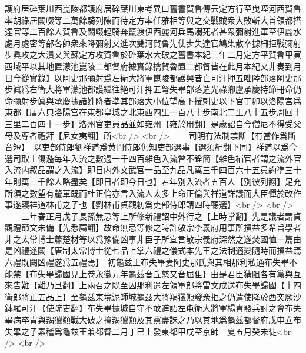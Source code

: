 護府居碎葉川西崑陵都護府居碎葉川東考異曰舊書賀魯傳云定方行至曳咥河西賀魯率胡祿居闕啜等二萬餘騎列陳而待定方率任雅相等與之交戰賊衆大敗斬大首領都搭達官等二百餘人賀魯及闕啜輕騎奔竄渡伊西麗河兵馬溺死者甚衆彌射進軍至伊麗水處月處密等部各帥衆來降彌射又進次雙河賀魯先使步失達官鳩集散卒據柵拒戰彌射步眞攻之大潰又與蘇定方攻賀魯於碎葉水大破之舊書本紀三年二月定方平賀魯甲寅西域平以其地置濛池崑陵二都督府據實錄擒賀魯置二都督皆在此月本紀又非奏到月日今從實錄】以阿史那彌射爲左衛大將軍崑陵都護興昔亡可汗押五咄陸部落阿史那步眞爲右衛大將軍濛池都護繼往絶可汗押五弩失畢部落遣光祿卿盧承慶持節冊命仍命彌射步眞與承慶據諸姓降者凖其部落大小位望高下授刺史以下官丁卯以洛陽宫爲東都【唐六典洛陽宫在東都皇城之北東西四里一百八十步南北二里八十五步周回十三里二百四十一步】洛州官吏員品並如雍州【雍於用翻】是歲詔自今僧尼不得受父母及尊者禮拜【尼女夷翻】所<br />
<br />
　　司明有法制禁斷【有當作爲斷音短】　以吏部侍郎劉祥道爲黄門侍郎仍知吏部選事【選須絹翻下同】祥道以爲今選司取士傷濫每年入流之數過一千四百雜色入流曾不銓簡【雜色補官者謂之流外官入流内叙品謂之入流】即日内外文武官一品至九品凡萬三千四百六十五員約凖三十年則萬三千餘人略盡矣【即日者即今日也】若年别入流者五百人【別彼列翻】足充所須之數望有釐革既而杜正倫亦言入流人太多上命正倫與祥道詳議而大臣憚於改作事遂寢祥道林甫之子也【劉林甫貞觀初爲吏部侍郎請四時聽選】<br />
<br />
　　三年春正月戊子長孫無忌等上所修新禮詔中外行之【上時掌翻】先是議者謂貞觀禮節文未備【先悉薦翻】故命無忌等修之時許敬宗李義府用事所損益多希旨學者非之太常博士蕭楚材等以爲豫備凶事非臣子所宜言敬宗義府深然之遂焚國恤一篇由是凶禮遂闕【唐制太常博士從七品上掌六禮之儀式本先王之法制適變隨時而損益焉六禮既闕凶禮遂爲五禮焉】　初龜兹王布失畢妻阿史那氏與其相那利私通布失畢不能禁【布失畢歸國見上卷永徽元年龜兹音丘慈又音屈隹】由是君臣猜阻各有黨與互來告難【難乃旦翻】上兩召之既至囚那利遣左領軍郎將雷文成送布失畢歸國【十四衛郎將正五品上】至龜兹東境泥師城龜兹大將羯獵顚發衆拒之仍遣使降於西突厥沙鉢羅可汗【使疏吏翻】布失畢據城自守不敢進詔左屯衛大將軍楊胄發兵討之會布失畢病卒胄與羯獵顚戰大破之擒羯獵顚及其黨盡誅之乃以其地爲龜兹都督府戊申立布失畢之子素稽爲龜兹王兼都督二月丁巳上發東都甲戌至京師　夏五月癸未徙<br />
<br />
